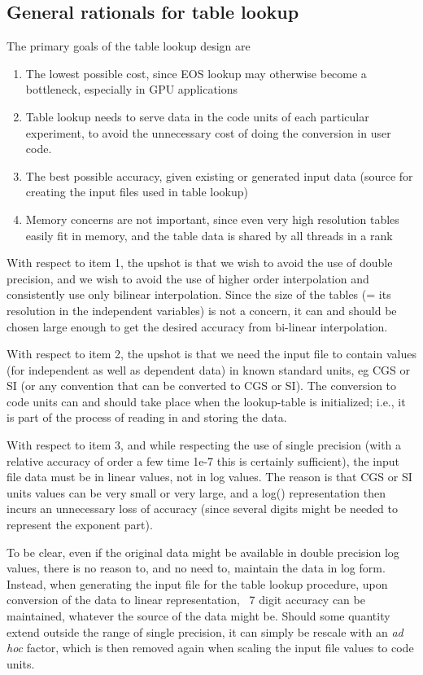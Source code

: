 \documentclass[paper=a4,fontsize=11pt]{scrartcl}
\numberwithin{equation}{section}		%
\numberwithin{figure}{section}			%
\numberwithin{table}{section}				%
\begin{document}
\subsection{General rationals for table lookup}
The primary goals of the table lookup design are
\begin{enumerate}
    \item The lowest possible cost, since EOS lookup may otherwise become a bottleneck, especially in GPU applications
    \item Table lookup needs to serve data in the code units of each particular experiment, to avoid the unnecessary cost of doing the conversion in user code.
    \item The best possible accuracy, given existing or generated input data (source for creating the input files used in table lookup)
    \item Memory concerns are not important, since even very high resolution tables easily fit in memory, and the table data is shared by all threads in a rank
\end{enumerate}

With respect to item 1, the upshot is that we wish to avoid the use of double precision, and we wish to avoid the use of higher order interpolation and consistently use only bilinear interpolation.   Since the size of the tables (= its resolution in the independent variables) is not a concern, it can and should be chosen large enough to get the desired accuracy from bi-linear interpolation.

With respect to item 2, the upshot is that we need the input file to contain values (for independent as well as dependent data) in known standard units, eg CGS or SI (or any convention that can be converted to CGS or SI).  The conversion to code units can and should take place when the lookup-table is initialized; i.e., it is part of the process of reading in and storing the data.

With respect to item 3, and while respecting the use of single precision (with a relative accuracy of order a few time 1e-7 this is certainly sufficient), the input file data must be in linear values, not in log values.  The reason is that CGS or SI units values can be very small or very large, and a log() representation then incurs an unnecessary loss of accuracy (since several digits might be needed to represent the exponent part).

To be clear, even if the original data might be available in double precision log values, there is no reason to, and no need to, maintain the data in log form.    Instead, when generating the input file for the table lookup procedure, upon conversion of the data to linear representation, ~7 digit accuracy can be maintained, whatever the source of the data might be.   Should some quantity extend outside the range of single precision, it can simply be rescale with an \textit{ad hoc} factor, which is then removed again when scaling the input file values to code units.
\end{document}
